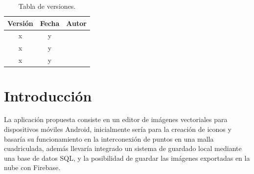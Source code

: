 \documentclass[a4paper,openright,12pt]{article}
\begin{document}
\newpage



\tableofcontents

\vspace{5cm}

\begin{flushright}
    \begin{table}[hbtp]
        \begin{center}
        
            \caption{Tabla de versiones.}
            \label{tabla:versiones}
            \small
            \vspace{1ex}
            
            \begin{tabular}{|c|c|l|}
                \hline
                Versión & Fecha & Autor \\
                \hline \hline
                x & y & \\ \hline
                x & y & \\ \hline
                x & y & \\ \hline
            \end{tabular}
            
        \end{center}
    \end{table}
\end{flushright}

\newpage
{}


\section{Introducción}\label{cap.introduccion}
La aplicación propuesta consiste en un editor de imágenes vectoriales para dispositivos móviles Android, inicialmente sería para la creación de iconos y basaría su funcionamiento en la interconexión de puntos en una malla cuadriculada, además llevaría integrado un sistema de guardado local mediante una base de datos SQL, y la posibilidad de guardar las imágenes exportadas en la nube con Firebase.
\end{document}
